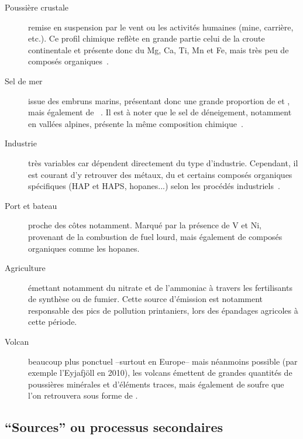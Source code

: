 \begin{description}
    \item[Poussière crustale] remise en suspension par le vent ou les activités humaines
        (mine, carrière, etc.). Ce profil chimique reflète en grande partie celui de la croute continentale
        et présente donc du Mg, Ca, Ti, Mn et Fe, mais très peu de composés
        organiques~\autocite{almeidaSource2005,dallostoHourly2013,morenoVariations2011,putaudSizesegregated2004}.

    \item[Sel de mer] issue des embruns marins, présentant donc une grande proportion de
         et , mais également de
        ~\autocite{belisCritical2013,odowdMarine1997,pioClimatology2007}. Il
        est à noter que le sel de déneigement, notamment en vallées alpines, présente la même
        composition chimique~\autocite{airrhone-alpesInfluence2012}.

    \item[Industrie] très variables car dépendent directement du type d'industrie.
        Cependant, il est courant d'y retrouver des métaux, du \SOq{} et certains composés
        organiques spécifiques (HAP et HAPS, hopanes...) selon les procédés
        industriels~\autocite{elhaddadPrimary2011,sylvestreComprehensive2017}.

    \item[Port et bateau] proche des côtes notamment. Marqué par la présence de V et Ni,
        provenant de la combustion de fuel lourd, mais également de composés organiques
        comme les hopanes.

    \item[Agriculture] émettant notamment du nitrate et de l'ammoniac à travers les
        fertilisants de synthèse ou de fumier. Cette source d'émission est notamment
        responsable des pics de pollution printaniers, lors des épandages agricoles à cette
        période.

    \item[Volcan] beaucoup plus ponctuel --surtout en Europe-- mais néanmoins possible
        (par exemple l'Eyjafjöll en 2010), les volcans émettent de grandes quantités de
        poussières minérales et d'éléments traces, mais également de soufre que l'on
        retrouvera sous forme de \SOq.

\end{description}

\subsection{``Sources'' ou processus secondaires}%
\label{sub:_sources_secondaires}

